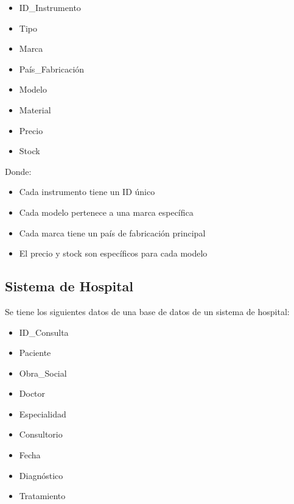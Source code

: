 \documentclass[12pt]{article}
\begin{document}
\begin{minipage}[t]{0.48\textwidth}
\begin{itemize}
    \item ID\_Instrumento
    \item Tipo
    \item Marca
    \item País\_Fabricación
\end{itemize}
\end{minipage}
\hfill
\begin{minipage}[t]{0.48\textwidth}
\begin{itemize}
    \item Modelo
    \item Material
    \item Precio
    \item Stock
\end{itemize}
\end{minipage}

\vspace{1em}

Donde:
\begin{itemize}
    \item Cada instrumento tiene un ID único
    \item Cada modelo pertenece a una marca específica
    \item Cada marca tiene un país de fabricación principal
    \item El precio y stock son específicos para cada modelo
\end{itemize}

\subsection{Sistema de Hospital}
Se tiene los siguientes datos de una base de datos de un sistema de hospital:

\vspace{0.5em}

\begin{minipage}[t]{0.48\textwidth}
\begin{itemize}
    \item ID\_Consulta
    \item Paciente
    \item Obra\_Social
    \item Doctor
    \item Especialidad
\end{itemize}
\end{minipage}
\hfill
\begin{minipage}[t]{0.48\textwidth}
\begin{itemize}
    \item Consultorio
    \item Fecha
    \item Diagnóstico
    \item Tratamiento
\end{itemize}
\end{minipage}
\end{document}
